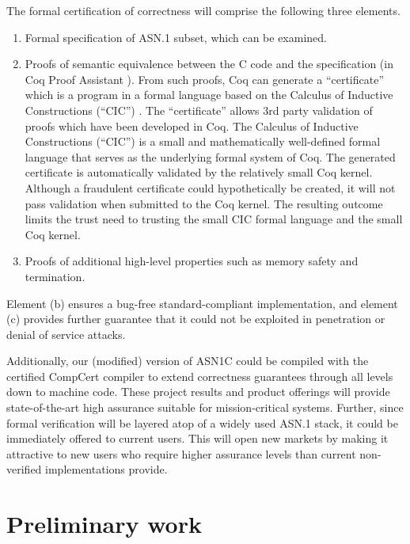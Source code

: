 \documentclass[acmsmall,nonacm]{acmart}
\begin{document}
The formal certification of correctness will comprise the following
three elements.

\begin{enumerate}[label=(\alph*)]

\item Formal specification of ASN.1 subset, which can be examined.

\item Proofs of semantic equivalence between the C code and the
  specification (in Coq Proof Assistant \cite{Coq}). From such
  proofs, Coq can generate a ``certificate'' which is a program in a
  formal language based on the Calculus of Inductive Constructions
  (``CIC'') \cite{CIC}. The ``certificate'' allows 3rd party
  validation of proofs which have been developed in Coq. The Calculus
  of Inductive Constructions (``CIC'') is a small and mathematically
  well-defined formal language that serves as the underlying formal
  system of Coq. The generated certificate is automatically validated
  by the relatively small Coq kernel. Although a fraudulent
  certificate could hypothetically be created, it will not pass
  validation when submitted to the Coq kernel. The resulting outcome
  limits the trust need to trusting the small CIC formal language and
  the small Coq kernel.

\item Proofs of additional high-level properties such as memory safety
  and termination.

\end{enumerate}
  

Element (b) ensures a bug-free standard-compliant implementation, and
element (c) provides further guarantee that it could not be exploited
in penetration or denial of service attacks.

Additionally, our (modified) version of ASN1C could be compiled with
the certified CompCert compiler \cite{CompCert} to extend correctness
guarantees through all levels down to machine code. These project
results and product offerings will provide state-of-the-art high
assurance suitable for mission-critical systems. Further, since formal
verification will be layered atop of a widely used ASN.1 stack, it
could be immediately offered to current users. This will open new
markets by making it attractive to new users who require higher
assurance levels than current non-verified implementations provide.

\section{Preliminary work}
\end{document}
